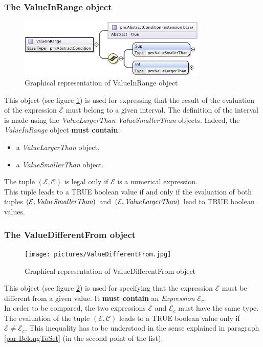 \documentclass[a4paper,11pt] {ivoa}
\begin{document}
\subsubsection{The ValueInRange object}
\begin{figure}[htbp]
\begin{center}
\includegraphics[width=0.8\textwidth]{pictures/ValueInRange.jpg} 
\caption{Graphical representation of ValueInRange object}
\label{Pic-ValueInRange}
\end{center}
\end{figure}
This object (see figure \ref{Pic-ValueInRange}) is used for expressing that the result of the
evaluation of the expression $\mathcal E$ must belong to a given interval. The definition of the
interval is made using the {\it ValueLargerThan} {\it ValueSmallerThan} objects.
Indeed, the {\it ValueInRange} object {\bf must contain}:
\begin{itemize}
\item a {\it ValueLargerThan} object,
\item a {\it ValueSmallerThan} object. 
\end{itemize}
The tuple $(\mathcal E, \mathcal C)$ is legal only if $\mathcal E$ is a numerical expression.\\
This tuple leads to a TRUE boolean value if and only if the evaluation of both tuples $(\mathcal E,
\mbox{\it ValueSmallerThan})$ and $(\mathcal E, \mbox{\it ValueLargerThan})$ lead to TRUE boolean
values.

\subsubsection{The ValueDifferentFrom object}
\begin{figure}[htbp]
\begin{center}
\texttt{[image: pictures/ValueDifferentFrom.jpg]} 
\caption{Graphical representation of ValueDifferentFrom object}
\label{Pic-ValueDifferentFrom}
\end{center}
\end{figure}
This object (see figure \ref{Pic-ValueDifferentFrom}) is used for specifying that the expression
$\mathcal E$ must be different from a given value.
It {\bf must contain} an {\it Expression} $\mathcal E_c$.\\
In order to be compared, the two expressions $\mathcal E$ and $\mathcal E_c$ must have the same
type.
The evaluation of the tuple $(\mathcal E, \mathcal C)$  leads to a TRUE boolean value only if
$\mathcal E \neq \mathcal E_c$. This inequality has to be understood in the sense explained in
paragraph \ref{par-BelongToSet} (in the second point of the list).
\end{document}
